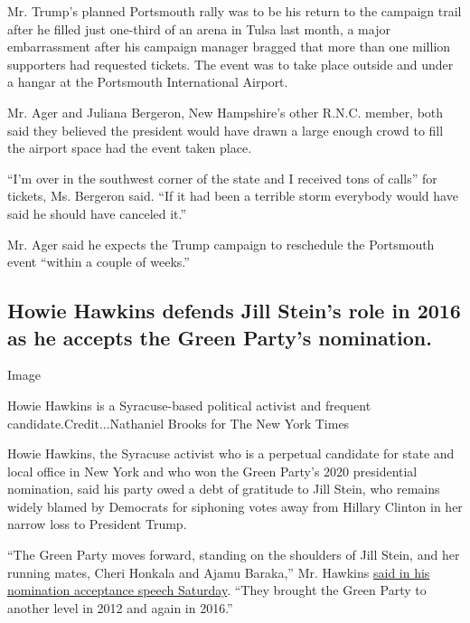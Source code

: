 Mr. Trump's planned Portsmouth rally was to be his return to the
campaign trail after he filled just one-third of an arena in Tulsa last
month, a major embarrassment after his campaign manager bragged that
more than one million supporters had requested tickets. The event was to
take place outside and under a hangar at the Portsmouth International
Airport.

Mr. Ager and Juliana Bergeron, New Hampshire's other R.N.C. member, both
said they believed the president would have drawn a large enough crowd
to fill the airport space had the event taken place.

``I'm over in the southwest corner of the state and I received tons of
calls'' for tickets, Ms. Bergeron said. ``If it had been a terrible
storm everybody would have said he should have canceled it.''

Mr. Ager said he expects the Trump campaign to reschedule the Portsmouth
event ``within a couple of weeks.''

\hypertarget{howie-hawkins-defends-jill-steins-role-in-2016-as-he-accepts-the-green-partys-nomination}{%
\subsection{Howie Hawkins defends Jill Stein's role in 2016 as he
accepts the Green Party's
nomination.}\label{howie-hawkins-defends-jill-steins-role-in-2016-as-he-accepts-the-green-partys-nomination}}

Image

Howie Hawkins is a Syracuse-based political activist and frequent
candidate.Credit...Nathaniel Brooks for The New York Times

Howie Hawkins, the Syracuse activist who is a perpetual candidate for
state and local office in New York and who won the Green Party's 2020
presidential nomination, said his party owed a debt of gratitude to Jill
Stein, who remains widely blamed by Democrats for siphoning votes away
from Hillary Clinton in her narrow loss to President Trump.

``The Green Party moves forward, standing on the shoulders of Jill
Stein, and her running mates, Cheri Honkala and Ajamu Baraka,'' Mr.
Hawkins
\href{https://howiehawkins.us/hawkins-nomination-speech/?utm_source=Press+and+Media\&utm_campaign=2dae87db3a-EMAIL_CAMPAIGN_2020_07_11_09_39\&utm_medium=email\&utm_term=0_79662d9b1d-2dae87db3a-25987978\&mc_cid=2dae87db3a\&mc_eid=ff2e4bed0d}{said
in his nomination acceptance speech Saturday}. ``They brought the Green
Party to another level in 2012 and again in 2016.''

